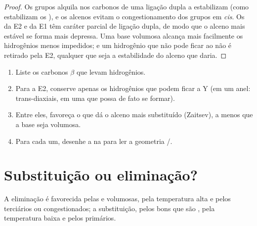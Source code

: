 \begin{proof}
Os grupos alquila nos carbonos de uma ligação dupla a estabilizam (como
estabilizam os ), e os alcenos  evitam o
congestionamento dos grupos em \textit{cis}. Os  da
E2 e da E1 têm caráter parcial de ligação dupla, de modo que o alceno
mais estável se forma mais depressa. Uma base volumosa alcança mais
facilmente os hidrogênios menos impedidos; e um hidrogênio que não pode
ficar  ao  não é retirado pela E2, qualquer
que seja a estabilidade do alceno que daria.
\end{proof}

\begin{method}\label{met:b1:elimination:predict-alkene}
\begin{enumerate}
  \item Liste os carbonos $\beta$ que levam hidrogênios.
  \item Para a E2, conserve apenas os hidrogênios que podem ficar
         a Y (em um anel: trans-diaxiais, em uma 
        que possa de fato se formar).
  \item Entre eles, favoreça o que dá o alceno mais substituído
        (Zaitsev), a menos que a base seja volumosa.
  \item Para cada um, desenhe a  na 
        para ler a geometria /.
\end{enumerate}
\end{method}

\section{Substituição ou eliminação?}

\begin{proposition}\label{prop:b1:elimination:sn-vs-e}
A eliminação é favorecida pelas  e volumosas, pela
temperatura alta e pelos  terciários ou congestionados; a
substituição, pelos bons  que são , pela
temperatura baixa e pelos  primários.
\end{proposition}


